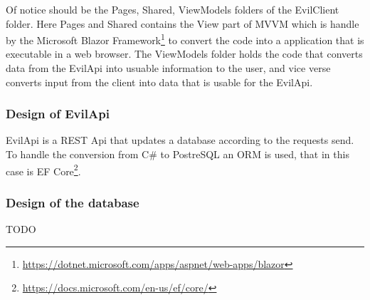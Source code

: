 \documentclass[report/main.tex]{subfiles}
\begin{document}
            Of notice should be the Pages, Shared, ViewModels folders of the EvilClient folder. Here Pages and Shared contains the View part of MVVM which is handle by the Microsoft Blazor Framework\footnote{\hyperlink{https://dotnet.microsoft.com/apps/aspnet/web-apps/blazor}{https://dotnet.microsoft.com/apps/aspnet/web-apps/blazor}} to convert the code into a application that is executable in a web browser. The ViewModels folder holds the code that converts data from the EvilApi into usuable information to the user, and vice verse converts input from the client into data that is usable for the EvilApi.

        \subsubsection{Design of EvilApi}
        \label{subsubsec:architecture-of-evilApi}
            EvilApi is a REST \cite{rest} Api that updates a database according to the requests send. To handle the conversion from C\# to PostreSQL an ORM is used, that in this case is EF Core\footnote{\hyperlink{https://docs.microsoft.com/en-us/ef/core/}{https://docs.microsoft.com/en-us/ef/core/}}.
        
        \subsubsection{Design of the database}
        \label{subsubsec:design-of-the-database}
            TODO
    
\end{document}

